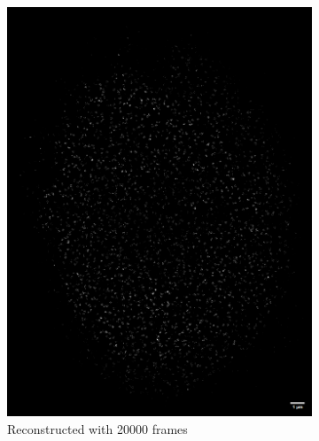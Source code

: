\documentclass[a4paper,english,12pt,bibliography=totoc]{scrreprt}
\begin{document}
\begin{figure}[hbpt]
\begin{subfigure}[b]{0.45\textwidth}
        \includegraphics[width=\textwidth]{Images/STORM/20000frames.png}
        \caption{Reconstructed with 20000 frames}
        \label{fig:image3}
    \end{subfigure}
    \hfill
    \begin{subfigure}[b]{0.45\textwidth}
        \centering

\end{subfigure}
\end{figure}
\end{document}
